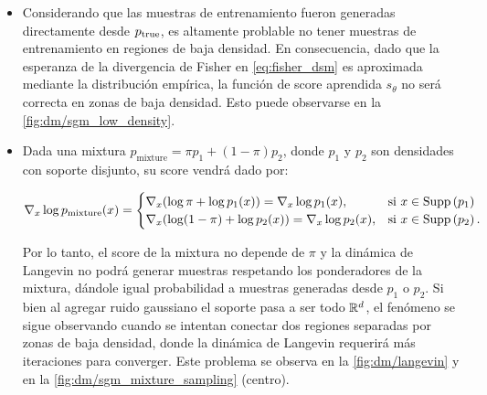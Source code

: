 \begin{itemize}
    \item Considerando que las muestras de entrenamiento fueron generadas directamente desde $p_{\operatorname{true}}$, es altamente problable no tener muestras de entrenamiento en regiones de baja densidad. En consecuencia, dado que la esperanza de la divergencia de Fisher en \eqref{eq:fisher_dsm} es aproximada mediante la distribución empírica, la función de score aprendida $s_\theta$ no será correcta en zonas de baja densidad. Esto puede observarse en la \autoref{fig:dm/sgm_low_density}.


    \item Dada una mixtura $p_{\text{mixture}} = \pi p_1 + (1-\pi) p_2$, donde $p_1$ y $p_2$ son densidades con soporte disjunto, su score vendrá dado por:

          \begin{equation*}
              \nabla_{x} \log p_{\text{mixture}}(x) = \begin{cases}
                  \nabla_x (\log \pi + \log p_1(x)) = \nabla_x\log p_1(x),     &\text{si } x\in\operatorname{Supp}\left(p_1\right) \\
                  \nabla_x (\log (1-\pi) + \log p_2(x)) = \nabla_x\log p_2(x), &\text{si } x\in\operatorname{Supp}\left(p_2\right) .
              \end{cases}
          \end{equation*}

          Por lo tanto, el score de la mixtura no depende de $\pi$ y la dinámica de Langevin no podrá generar muestras respetando los ponderadores de la mixtura, dándole igual probabilidad a muestras generadas desde $p_1$ o $p_2$. Si bien al agregar ruido gaussiano el soporte pasa a ser todo $\mathbb{R}^d$, el fenómeno se sigue observando cuando se intentan conectar dos regiones separadas por zonas de baja densidad, donde la dinámica de Langevin requerirá más iteraciones para converger. Este problema se observa en la \autoref{fig:dm/langevin} y en la \autoref{fig:dm/sgm_mixture_sampling} (centro).
\end{itemize}

